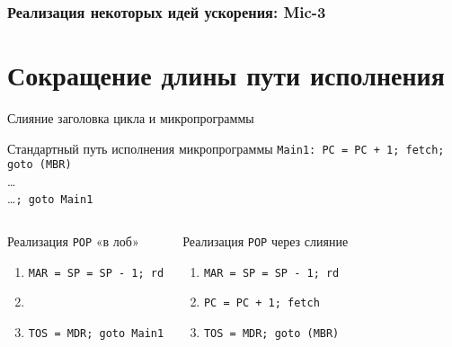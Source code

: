 \begin{frame}[plain]
\frametitle{Реализация некоторых идей ускорения: Mic-3}
\vspace{-.2cm}
\end{frame}

\section{Сокращение длины пути исполнения}

\begin{frame}{Слияние заголовка цикла и микропрограммы}
\small
\pause
\begin{block}{Стандартный путь исполнения микропрограммы}
\pause
\texttt{Main1: PC = PC + 1; fetch; goto (MBR)}\\
\ldots\\
\ldots\texttt{; goto Main1}
\end{block}
\pause
\begin{columns}
    \column{5.5cm}
    \begin{block}{Реализация \texttt{POP} «в лоб»}
    \pause
    \begin{enumerate}
        \item \texttt{MAR = SP = SP - 1; rd}
        \item \texttt{}
        \item \texttt{TOS = MDR; goto Main1}
    \end{enumerate}
    \end{block}

    \pause
    \column{6cm}
    \begin{block}{Реализация \texttt{POP} через слияние}
    \begin{enumerate}
        \item \texttt{MAR = SP = SP - 1; rd}
        \item \texttt{PC = PC + 1; fetch}
        \item \texttt{TOS = MDR; goto (MBR)}
    \end{enumerate}
    \end{block}
\end{columns}
\end{frame}

